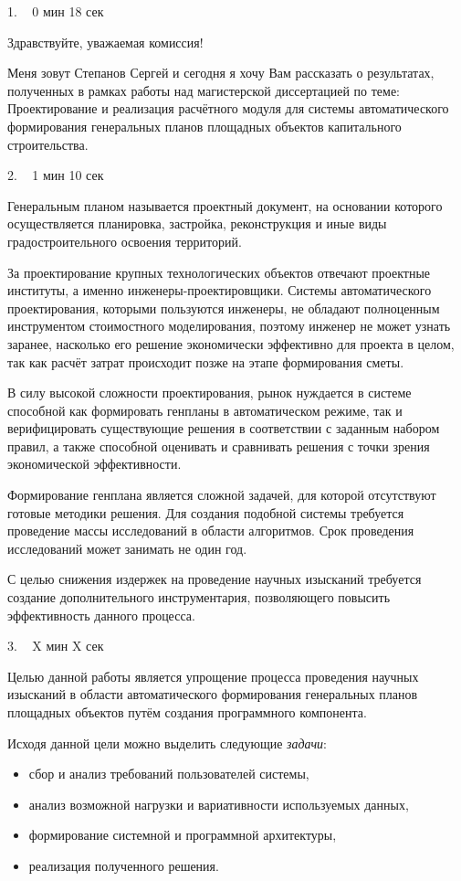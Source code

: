 \documentclass[a4paper,14pt]{extarticle}
\begin{document}
    1. ~ 0 мин 18 сек

    Здравствуйте, уважаемая комиссия!

    Меня зовут Степанов Сергей и сегодня я хочу Вам рассказать о результатах,
    полученных в рамках работы над магистерской диссертацией по теме:
    Проектирование и реализация расчётного модуля для системы автоматического формирования
    генеральных планов площадных объектов капитального строительства.


    2. ~ 1 мин 10 сек

    Генеральным планом называется
    проектный документ, на основании которого осуществляется планировка,
    застройка, реконструкция и иные виды градостроительного освоения территорий.

    За проектирование крупных технологических объектов отвечают проектные институты,
    а именно инженеры-проектировщики. Системы автоматического проектирования, которыми
    пользуются инженеры, не обладают полноценным инструментом стоимостного моделирования,
    поэтому инженер не может узнать заранее,
    насколько его решение экономически эффективно для проекта в целом,
    так как расчёт затрат происходит позже на этапе формирования сметы.

    В силу высокой сложности проектирования,
    рынок нуждается в системе способной как формировать генпланы в автоматическом режиме,
    так и верифицировать существующие решения в соответствии с заданным набором правил,
    а также способной оценивать и сравнивать решения с точки зрения экономической эффективности.

    Формирование генплана является сложной задачей, для которой отсутствуют готовые методики решения.
    Для создания подобной системы требуется проведение массы исследований в области алгоритмов.
    Срок проведения исследований может занимать не один год.

    С целью снижения издержек на проведение научных изысканий требуется создание дополнительного инструментария,
    позволяющего повысить эффективность данного процесса.

    3. ~ X мин X сек

    Целью данной работы является
    упрощение процесса проведения научных изысканий
    в области автоматического формирования генеральных планов площадных объектов
    путём создания программного компонента.

    Исходя данной цели можно выделить следующие \textit{задачи}:
    \begin{itemize}
        \item сбор и анализ требований пользователей системы,
        \item анализ возможной нагрузки и вариативности используемых данных,
        \item формирование системной и программной архитектуры,
        \item реализация полученного решения.
    \end{itemize}
\end{document}
